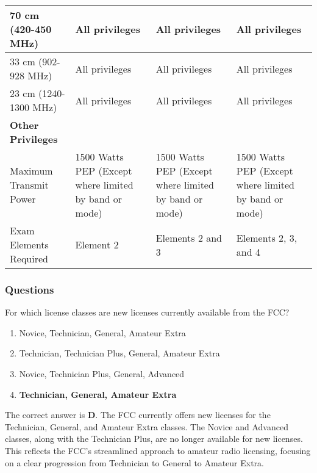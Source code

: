 \begin{table}[h!]
\begin{tabular}{|p{2.5cm}|p{3.5cm}|p{3.5cm}|p{3.5cm}|}
    \hline
    70 cm (420-450 MHz) & All privileges & All privileges & All privileges \\
    \hline
    33 cm (902-928 MHz) & All privileges & All privileges & All privileges \\
    \hline
    23 cm (1240-1300 MHz) & All privileges & All privileges & All privileges \\
    \hline
    \textbf{Other Privileges} &  &  &  \\
    \hline
    Maximum Transmit Power & 1500 Watts PEP (Except where limited by band or mode) & 1500 Watts PEP (Except where limited by band or mode) & 1500 Watts PEP (Except where limited by band or mode)\\
    \hline
    Exam Elements Required & Element 2 & Elements 2 and 3 & Elements 2, 3, and 4 \\
    \hline
    
    \end{tabular}
    \end{table}

\subsubsection*{Questions}
\begin{tcolorbox}[colback=gray!10!white,colframe=black!75!black,title={T1C01}]
For which license classes are new licenses currently available from the FCC?
\begin{enumerate}[label=\Alph*),noitemsep]
    \item Novice, Technician, General, Amateur Extra
    \item Technician, Technician Plus, General, Amateur Extra
    \item Novice, Technician Plus, General, Advanced
    \item \textbf{Technician, General, Amateur Extra}
\end{enumerate}
\end{tcolorbox}

The correct answer is \textbf{D}. The FCC currently offers new licenses for the Technician, General, and Amateur Extra classes. The Novice and Advanced classes, along with the Technician Plus, are no longer available for new licenses. This reflects the FCC's streamlined approach to amateur radio licensing, focusing on a clear progression from Technician to General to Amateur Extra.

